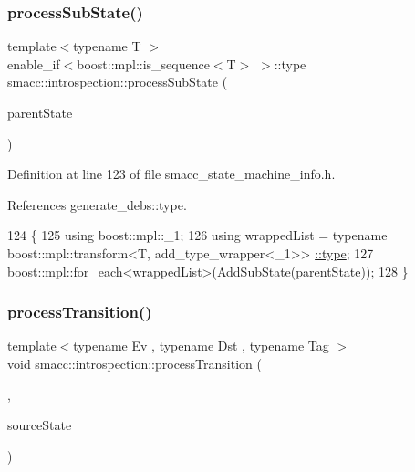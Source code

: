 \subsubsection{\texorpdfstring{process\+Sub\+State()}{processSubState()}\hspace{0.1cm}{\footnotesize\ttfamily [2/2]}}
{\footnotesize\ttfamily template$<$typename T $>$ \\
enable\+\_\+if$<$boost\+::mpl\+::is\+\_\+sequence$<$T$>$ $>$\+::type smacc\+::introspection\+::process\+Sub\+State (\begin{DoxyParamCaption}\item[{std\+::shared\+\_\+ptr$<$ \hyperlink{classsmacc_1_1introspection_1_1SmaccStateInfo}{Smacc\+State\+Info} $>$ \&}]{parent\+State }\end{DoxyParamCaption})}



Definition at line 123 of file smacc\+\_\+state\+\_\+machine\+\_\+info.\+h.



References generate\+\_\+debs\+::type.


\begin{DoxyCode}
124 \{
125     \textcolor{keyword}{using} boost::mpl::\_1;
126     \textcolor{keyword}{using} wrappedList = \textcolor{keyword}{typename} boost::mpl::transform<T, add\_type\_wrapper<\_1>>
      \hyperlink{namespacegenerate__debs_a50bc9a7ecac9584553e089a448bcde58}{::type};
127     boost::mpl::for\_each<wrappedList>(AddSubState(parentState));
128 \}
\end{DoxyCode}
\mbox{\label{namespacesmacc_1_1introspection_a91f7cda900e7002c923494db5afce63f}} 
\subsubsection{\texorpdfstring{process\+Transition()}{processTransition()}\hspace{0.1cm}{\footnotesize\ttfamily [1/4]}}
{\footnotesize\ttfamily template$<$typename Ev , typename Dst , typename Tag $>$ \\
void smacc\+::introspection\+::process\+Transition (\begin{DoxyParamCaption}\item[{\hyperlink{classsmacc_1_1Transition}{smacc\+::\+Transition}$<$ Ev, boost\+::statechart\+::deep\+\_\+history$<$ Dst $>$, Tag $>$ $\ast$}]{,  }\item[{std\+::shared\+\_\+ptr$<$ \hyperlink{classsmacc_1_1introspection_1_1SmaccStateInfo}{Smacc\+State\+Info} $>$ \&}]{source\+State }\end{DoxyParamCaption})}



